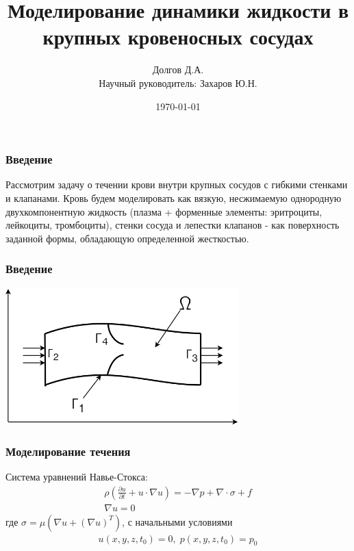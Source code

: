 \documentclass[14pt]{beamer}
\title[Моделирование динамики жидкости в сосудах]{Моделирование динамики жидкости в крупных кровеносных сосудах}
\date{\today}
\author[Долгов Д.А.]{Долгов Д.А.\\{\small Научный руководитель: Захаров Ю.Н.}}
\institute{Кемеровский Государственный Университет \\
    \vspace{0.7cm}
    \vspace{0.7cm}
}
\begin{document}
\maketitle

\begin{frame}
\frametitle{Введение}
Рассмотрим задачу о течении крови внутри крупных сосудов с гибкими стенками и клапанами. Кровь будем моделировать как вязкую, несжимаемую однородную двухкомпонентную жидкость (плазма + форменные элементы: эритроциты, лейкоциты, тромбоциты), стенки сосуда и лепестки клапанов - как поверхность заданной формы, обладающую определенной жесткостью.
\end{frame}

\begin{frame}
\frametitle{Введение}
    \begin{center}
        \includegraphics[width=9cm]{area.png}
    \end{center}
\end{frame}

\begin{frame}
\frametitle{Моделирование течения}
Система уравнений Навье-Стокса:
\begin{gather}
    \label{eq:motion}
    \rho ( \frac{\partial u}{\partial t} + u \cdot \nabla u) = - \nabla p + \nabla \cdot \sigma + f\\
    \label{eq:continuity}
    \nabla u = 0 
\end{gather}
где $\sigma = \mu (\nabla u + (\nabla u)^{T})$, с начальными условиями
\begin{gather}
    u(x, y, z, t_0) = 0,\;p(x, y, z, t_0) = p_0
\end{gather}

\end{frame}
\end{document}
